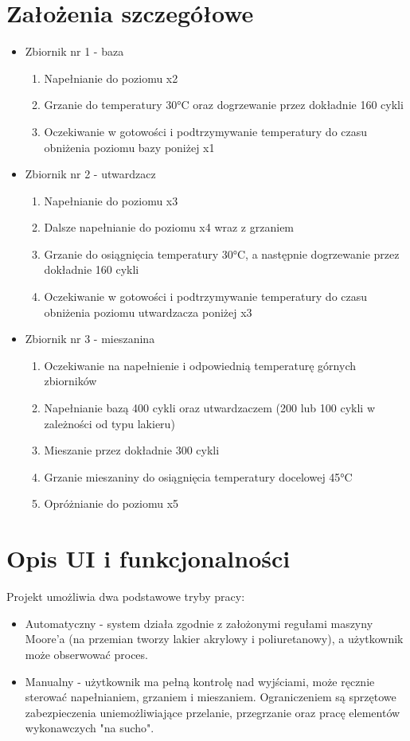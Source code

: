 \documentclass[12pt,oneside]{article}
\begin{document}
\section{Założenia szczegółowe}
\begin{itemize}
    \item Zbiornik nr 1 - baza
    \begin{enumerate}
        \item Napełnianie do poziomu x2
        \item Grzanie do temperatury 30°C oraz dogrzewanie przez dokładnie 160 cykli
        \item Oczekiwanie w gotowości i podtrzymywanie temperatury do czasu obniżenia poziomu bazy poniżej x1
    \end{enumerate}
    \item Zbiornik nr 2 - utwardzacz
        \begin{enumerate}
        \item Napełnianie do poziomu x3
        \item Dalsze napełnianie do poziomu x4 wraz z grzaniem 
        \item Grzanie do osiągnięcia temperatury 30°C, a następnie dogrzewanie przez dokładnie 160 cykli
        \item Oczekiwanie w gotowości i podtrzymywanie temperatury do czasu obniżenia poziomu utwardzacza poniżej x3
    \end{enumerate}
    \item Zbiornik nr 3 - mieszanina
        \begin{enumerate}
        \item Oczekiwanie na napełnienie i odpowiednią temperaturę górnych zbiorników
        \item Napełnianie bazą 400 cykli oraz utwardzaczem (200 lub 100 cykli w zależności od typu lakieru) 
        \item Mieszanie przez dokładnie 300 cykli
        \item Grzanie mieszaniny do osiągnięcia temperatury docelowej 45°C
        \item Opróżnianie do poziomu x5
    \end{enumerate}
\end{itemize}

\section{Opis UI i funkcjonalności}
Projekt umożliwia dwa podstawowe tryby pracy:
\begin{itemize}
    \item Automatyczny - system działa zgodnie z założonymi regułami maszyny Moore'a (na przemian tworzy lakier akrylowy i poliuretanowy), a użytkownik może obserwować proces.
    \item Manualny - użytkownik ma pełną kontrolę nad wyjściami, może ręcznie sterować napełnianiem, grzaniem i mieszaniem. Ograniczeniem są sprzętowe zabezpieczenia uniemożliwiające przelanie, przegrzanie oraz pracę elementów wykonawczych "na sucho".
\end{itemize}
\end{document}
